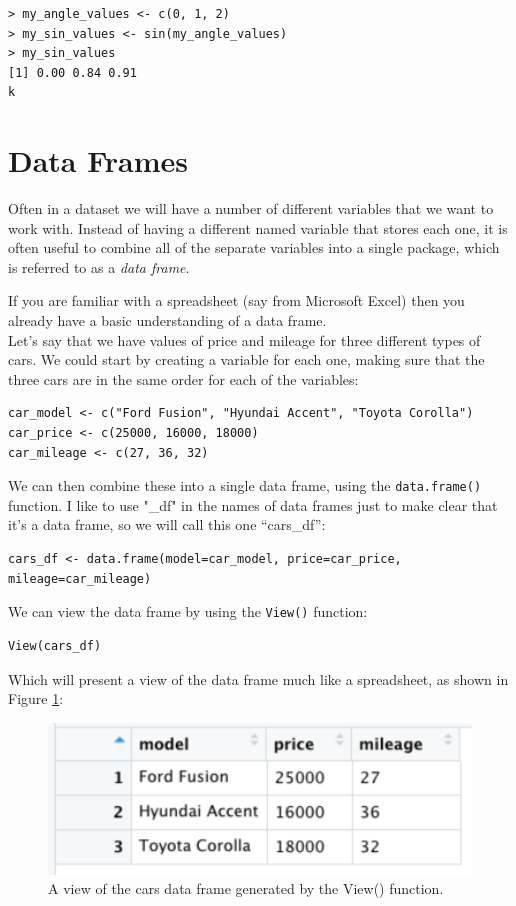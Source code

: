 \documentclass[12pt,]{book}
\begin{document}
\begin{verbatim}
> my_angle_values <- c(0, 1, 2)
> my_sin_values <- sin(my_angle_values)
> my_sin_values
[1] 0.00 0.84 0.91
k
\end{verbatim}

\hypertarget{data-frames}{%
\section{Data Frames}\label{data-frames}}

Often in a dataset we will have a number of different variables that we want to work with. Instead of having a different named variable that stores each one, it is often useful to combine all of the separate variables into a single package, which is referred to as a \emph{data frame}.

If you are familiar with a spreadsheet (say from Microsoft Excel) then you already have a basic understanding of a data frame.\\
Let's say that we have values of price and mileage for three different types of cars. We could start by creating a variable for each one, making sure that the three cars are in the same order for each of the variables:

\begin{verbatim}
car_model <- c("Ford Fusion", "Hyundai Accent", "Toyota Corolla")
car_price <- c(25000, 16000, 18000)
car_mileage <- c(27, 36, 32)
\end{verbatim}

We can then combine these into a single data frame, using the \texttt{data.frame()} function. I like to use "\_df" in the names of data frames just to make clear that it's a data frame, so we will call this one ``cars\_df'':

\begin{verbatim}
cars_df <- data.frame(model=car_model, price=car_price, mileage=car_mileage)
\end{verbatim}

We can view the data frame by using the \texttt{View()} function:

\begin{verbatim}
View(cars_df)
\end{verbatim}

Which will present a view of the data frame much like a spreadsheet, as shown in Figure \ref{fig:carsDf}:

\begin{figure}
\includegraphics[width=5.11in]{images/cars_df} \caption{A view of the cars data frame generated by the View() function.}\label{fig:carsDf}
\end{figure}
\end{document}
